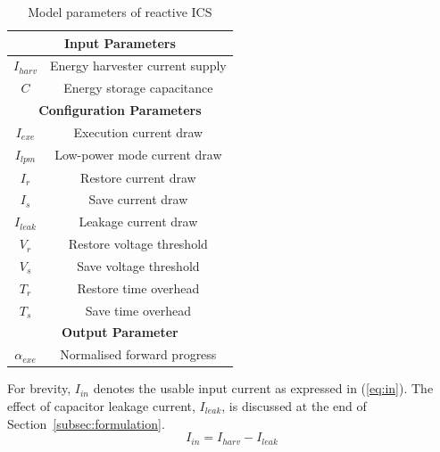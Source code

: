 \begin{table}[!t]
    \renewcommand{\arraystretch}{1.2}
    \centering
    \caption{Model parameters of reactive ICS} 
    \label{tab:parameter}
    \begin{tabular}{|c|c|}
        \hline
        \multicolumn{2}{|c|}{\textbf{Input Parameters}}\\
        \hline
        $I_{harv}$ & Energy harvester current supply\\
        $C$ & Energy storage capacitance\\
        \hline
        \multicolumn{2}{|c|}{\textbf{Configuration Parameters}}\\
        \hline
        $I_{exe}$ & Execution current draw\\
        $I_{lpm}$ & Low-power mode current draw\\
        $I_{r}$ & Restore current draw\\
        $I_{s}$ & Save current draw\\
        $I_{leak}$ & Leakage current draw\\
        $V_{r}$ & Restore voltage threshold\\
        $V_{s}$ & Save voltage threshold\\
        $T_{r}$ & Restore time overhead\\
        $T_{s}$ & Save time overhead\\
        \hline
        \multicolumn{2}{|c|}{\textbf{Output Parameter}}\\
        \hline
        $\alpha_{exe}$ & Normalised forward progress \\ 
        \hline
    \end{tabular}
\end{table}

For brevity, $I_{in}$ denotes the usable input current as expressed in (\ref{eq:in}). The effect of capacitor leakage current, $I_{leak}$, is discussed at the end of Section~\ref{subsec:formulation}.
\begin{equation}
  I_{in} = I_{harv} - I_{leak}
  \label{eq:in}
\end{equation}

